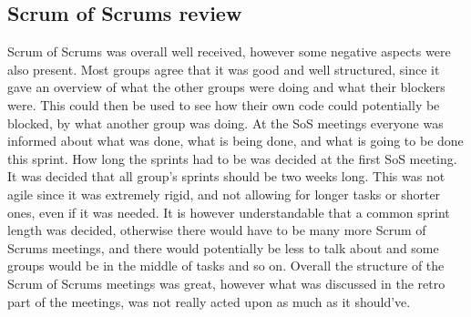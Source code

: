 \subsection{Scrum of Scrums review}\label{sec:sosreview}
Scrum of Scrums was overall well received, however some negative aspects were also present.
Most groups agree that it was good and well structured, since it gave an overview of what the other groups were doing and what their blockers were.
This could then be used to see how their own code could potentially be blocked, by what another group was doing.
At the SoS meetings everyone was informed about what was done, what is being done, and what is going to be done this sprint. 
How long the sprints had to be was decided at the first SoS meeting.
It was decided that all group's sprints should be two weeks long. This was not agile since it was extremely rigid, and not allowing for longer tasks or shorter ones, even if it was needed.
It is however understandable that a common sprint length was decided, otherwise there would have to be many more Scrum of Scrums meetings, and there would potentially be less to talk about and some groups would be in the middle of tasks and so on.
Overall the structure of the Scrum of Scrums meetings was great, however what was discussed in the retro part of the meetings, was not really acted upon as much as it should've.

